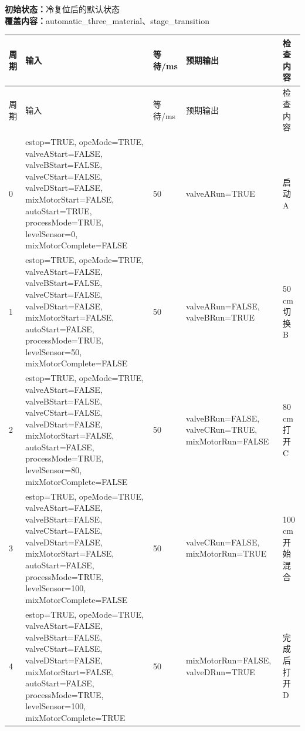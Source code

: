 \noindent\textbf{初始状态：}冷复位后的默认状态\\

\textbf{覆盖内容：}automatic\_three\_material、stage\_transition

\begin{longtable}{L{1.0cm}L{4.7cm}L{1.4cm}L{4.0cm}L{2.1cm}}

\toprule

周期 & 输入 & 等待/ms & 预期输出 & 检查内容\\

\midrule

\endfirsthead

\toprule

周期 & 输入 & 等待/ms & 预期输出 & 检查内容\\

\midrule

\endhead

0 & estop=TRUE, opeMode=TRUE, valveAStart=FALSE, valveBStart=FALSE, valveCStart=FALSE, valveDStart=FALSE, mixMotorStart=FALSE, autoStart=TRUE, processMode=TRUE, levelSensor=0, mixMotorComplete=FALSE & 50 & valveARun=TRUE & 启动 A\\

1 & estop=TRUE, opeMode=TRUE, valveAStart=FALSE, valveBStart=FALSE, valveCStart=FALSE, valveDStart=FALSE, mixMotorStart=FALSE, autoStart=FALSE, processMode=TRUE, levelSensor=50, mixMotorComplete=FALSE & 50 & valveARun=FALSE, valveBRun=TRUE & 50 cm 切换 B\\

2 & estop=TRUE, opeMode=TRUE, valveAStart=FALSE, valveBStart=FALSE, valveCStart=FALSE, valveDStart=FALSE, mixMotorStart=FALSE, autoStart=FALSE, processMode=TRUE, levelSensor=80, mixMotorComplete=FALSE & 50 & valveBRun=FALSE, valveCRun=TRUE, mixMotorRun=FALSE & 80 cm 打开 C\\

3 & estop=TRUE, opeMode=TRUE, valveAStart=FALSE, valveBStart=FALSE, valveCStart=FALSE, valveDStart=FALSE, mixMotorStart=FALSE, autoStart=FALSE, processMode=TRUE, levelSensor=100, mixMotorComplete=FALSE & 50 & valveCRun=FALSE, mixMotorRun=TRUE & 100 cm 开始混合\\

4 & estop=TRUE, opeMode=TRUE, valveAStart=FALSE, valveBStart=FALSE, valveCStart=FALSE, valveDStart=FALSE, mixMotorStart=FALSE, autoStart=FALSE, processMode=TRUE, levelSensor=100, mixMotorComplete=TRUE & 50 & mixMotorRun=FALSE, valveDRun=TRUE & 完成后打开 D\\

\bottomrule

\end{longtable}

